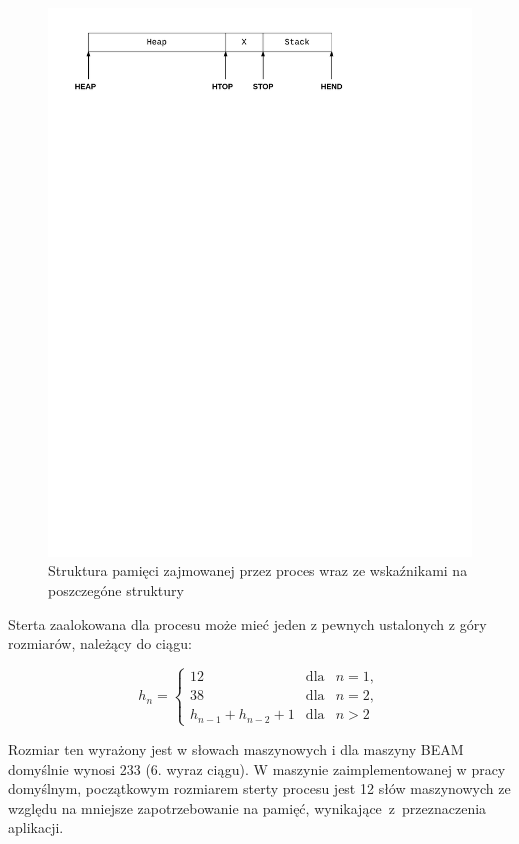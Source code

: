 \begin{figure}[h]
\centerline{\includegraphics[scale=1, clip, trim=10mm 235mm 65mm 10mm]{heap}}
\caption{Struktura pamięci zajmowanej przez proces wraz ze wskaźnikami na poszczegóne struktury}
\label{fig:heap}
\end{figure}

Sterta zaalokowana dla procesu może mieć jeden z pewnych ustalonych z góry rozmiarów, należący do ciągu:

\begin{equation}
h_{n} = \left\lbrace
\begin{array}{rcl}
12 & \text{dla} & n = 1,\\
38 & \text{dla} & n = 2,\\
h_{n-1} + h_{n-2} + 1 & \text{dla} & n > 2
\end{array}
\right.
\end{equation}

Rozmiar ten wyrażony jest w słowach maszynowych i dla maszyny BEAM domyślnie wynosi 233 (6. wyraz ciągu).
W maszynie zaimplementowanej w pracy domyślnym, początkowym rozmiarem sterty procesu jest 12 słów maszynowych ze względu na mniejsze zapotrzebowanie na pamięć, wynikające~z~przeznaczenia aplikacji.

